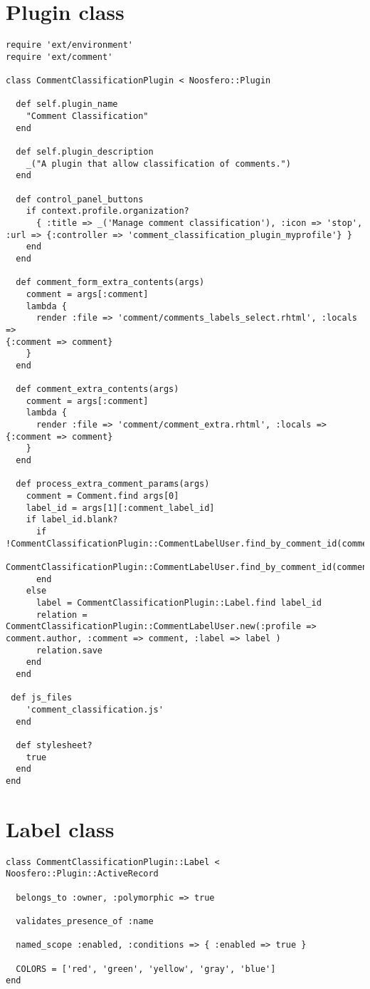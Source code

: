 \section{Plugin class} \label{App:PluginCode}

\begin{lstlisting}[style=codeFrame]
require 'ext/environment'
require 'ext/comment'

class CommentClassificationPlugin < Noosfero::Plugin

  def self.plugin_name
    "Comment Classification"
  end

  def self.plugin_description
    _("A plugin that allow classification of comments.")
  end

  def control_panel_buttons
    if context.profile.organization?
      { :title => _('Manage comment classification'), :icon => 'stop',
:url => {:controller => 'comment_classification_plugin_myprofile'} }
    end
  end

  def comment_form_extra_contents(args)
    comment = args[:comment]
    lambda {
      render :file => 'comment/comments_labels_select.rhtml', :locals =>
{:comment => comment}
    }
  end

  def comment_extra_contents(args)
    comment = args[:comment]
    lambda {
      render :file => 'comment/comment_extra.rhtml', :locals =>
{:comment => comment}
    }
  end

  def process_extra_comment_params(args)
    comment = Comment.find args[0]
    label_id = args[1][:comment_label_id]
    if label_id.blank?
      if
!CommentClassificationPlugin::CommentLabelUser.find_by_comment_id(comment.id).nil?
        CommentClassificationPlugin::CommentLabelUser.find_by_comment_id(comment.id).destroy
      end
    else
      label = CommentClassificationPlugin::Label.find label_id
      relation =
CommentClassificationPlugin::CommentLabelUser.new(:profile =>
comment.author, :comment => comment, :label => label )
      relation.save
    end
  end

 def js_files
    'comment_classification.js'
  end

  def stylesheet?
    true
  end
end
\end{lstlisting}

\newpage
\section{Label class} \label{App:PluginLabel}

\begin{lstlisting}[style=codeFrame]
class CommentClassificationPlugin::Label <
Noosfero::Plugin::ActiveRecord

  belongs_to :owner, :polymorphic => true

  validates_presence_of :name

  named_scope :enabled, :conditions => { :enabled => true }

  COLORS = ['red', 'green', 'yellow', 'gray', 'blue']
end
\end{lstlisting}


